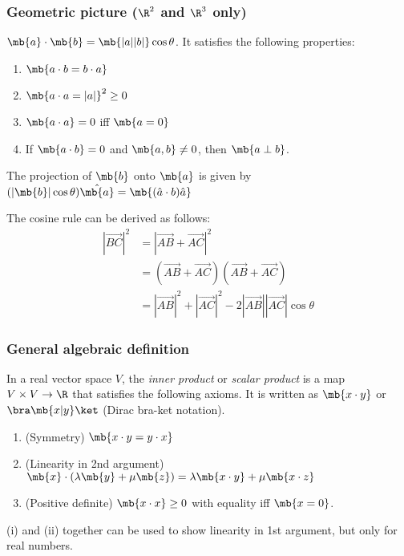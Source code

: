\documentclass[a4paper]{article}
\begin{document}
\subsubsection{Geometric picture (\texorpdfstring{$\R^2$}{R2} and \texorpdfstring{$\R^3$}{R3} only)}
\begin{defi}
  $\mb{a}\cdot\mb{b} = \mb{|a||b|}\cos\theta$. It satisfies the following properties:
  \begin{enumerate}
  \item $\mb{a\cdot b = b\cdot a}$
  \item $\mb{a\cdot a = |a|}^2 \geq 0$
  \item $\mb{a\cdot a} = 0$ iff $\mb{a = 0}$
  \item If $\mb{a\cdot b} = 0$ and $\mb{a, b}\not= 0$, then $\mb{a \perp b}$.
  \end{enumerate}
\end{defi}

The projection of $\mb{b}$ onto $\mb{a}$ is given by $(|\mb{b}|\cos\theta)\hat{\mb{a}} = \mb{(\hat{a}\cdot b)\hat{a}}$

The cosine rule can be derived as follows:
\begin{align*}
  |\overrightarrow{BC}|^2 &= |\overrightarrow{AB} + \overrightarrow{AC}|^2\\
  &= (\overrightarrow{AB} + \overrightarrow{AC})(\overrightarrow{AB} + \overrightarrow{AC})\\
  &= |\overrightarrow{AB}|^2 + |\overrightarrow{AC}|^2 - 2|\overrightarrow{AB}||\overrightarrow{AC}|\cos\theta
\end{align*}

\subsubsection{General algebraic definition}
\begin{defi}
  In a real vector space $V$, the \emph{inner product} or \emph{scalar product} is a map $V\times V\to \R$ that satisfies the following axioms. It is written as $\mb{x\cdot y}$ or $\bra\mb{x|y}\ket$ (Dirac bra-ket notation).
  \begin{enumerate}
  \item (Symmetry) $\mb{x\cdot y = y\cdot x}$
  \item (Linearity in 2nd argument) $\mb{x}\cdot (\lambda\mb{y} + \mu\mb{z}) = \lambda\mb{x\cdot y} + \mu\mb{x\cdot z}$
  \item (Positive definite) $\mb{x\cdot x}\geq 0$ with equality iff $\mb{x = 0}$.
  \end{enumerate}
\end{defi}
\note (i) and (ii) together can be used to show linearity in 1st argument, but only for real numbers.
\end{document}
